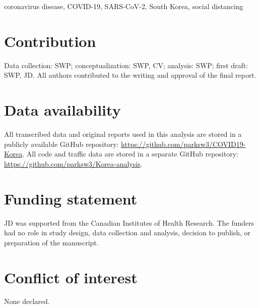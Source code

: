 \documentclass[12pt]{article}
\begin{document}
coronavirus disease, COVID-19, SARS-CoV-2, South Korea, social distancing

\section*{Contribution}

Data collection: SWP; conceptualization: SWP, CV; analysis: SWP; first draft: SWP, JD. All authors contributed to the writing and approval of the final report.

\section*{Data availability}

All transcribed data and original reports used in this analysis are stored in a publicly available GitHub repository: \url{https://github.com/parksw3/COVID19-Korea}.
All code and traffic data are stored in a separate GitHub repository: \url{https://github.com/parksw3/Korea-analysis}.

\section*{Funding statement}

JD was supported from the Canadian Institutes of Health Research. The funders had no role in study design, data collection and analysis, decision to publish, or preparation of the manuscript.

\section*{Conflict of interest}

None declared.
\end{document}
